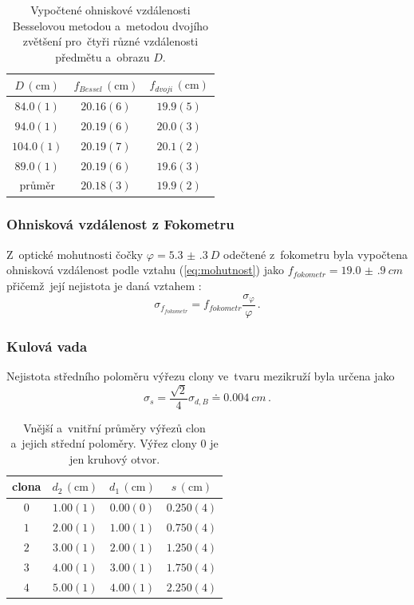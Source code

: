 \documentclass{../concepts/titul_zprava_p/prepareprotokolZprava} %
\newcommand{\relative}[1]{
\frac{\sigma_{#1}}{#1}
}
\begin{document}
\begin{table}[!htbp]
\centering
\caption{Vypočtené ohniskové vzdálenosti Besselovou metodou a~metodou dvojího zvětšení pro~čtyři různé vzdálenosti předmětu
a~obrazu $D$.}
\begin{tabular}{ccc}
 \toprule
 $D\, (\mathrm{cm})$ & $f_{Bessel}\, (\mathrm{cm})$ & $f_{dvoji}\, (\mathrm{cm})$ \\
 \midrule
 $84.0(1)$ & $20.16(6)$ & $19.9(5)$ \\
 $94.0(1)$ & $20.19(6)$ & $20.0(3)$ \\
 $104.0(1)$ & $20.19(7)$ & $20.1(2)$ \\
 $89.0(1)$ & $20.19(6)$ & $19.6(3)$ \\
 \midrule
 průměr & $20.18(3)$ & $19.9(2)$ \\
 \bottomrule
\end{tabular}
\label{tab:ohniskove_vzdalenosti}
\end{table}

\subsubsection{Ohnisková vzdálenost z Fokometru}
Z~optické mohutnosti čočky $\varphi = \qty{5.3(3)}{D}$ odečtené z~fokometru byla vypočtena ohnisková vzdálenost 
podle vztahu (\ref{eq:mohutnost}) jako $f_{fokometr} = \qty{19.0(9)}{cm}$
přičemž~její nejistota je daná vztahem \cite{englich}:
\begin{equation}
    \label{eq:sigma_f_mohutnost}
    \sigma_{f_{fokometr}} = f_{fokometr} \relative{\varphi} \,.
\end{equation}


\subsubsection{Kulová vada}

Nejistota středního poloměru výřezu clony ve~tvaru mezikruží byla určena jako
\begin{equation}
    \label{eq:sigma_s}
    \sigma_s = \frac{\sqrt{2}}{4} \sigma_{d,B} \doteq \qty{0.004}{cm} \,.
\end{equation}

\begin{table}[!htbp]
\centering
\caption{Vnější a~vnitřní průměry výřezů clon a~jejich střední poloměry. Výřez clony $0$ je jen kruhový otvor.}
\begin{tabular}{cccc}
 \toprule
 clona & $d_2\, (\mathrm{cm})$ & $d_1\, (\mathrm{cm})$ & $s\, (\mathrm{cm})$ \\
 \midrule
 $0$ & $1.00(1)$ & $0.00(0)$ & $0.250(4)$ \\
 $1$ & $2.00(1)$ & $1.00(1)$ & $0.750(4)$ \\
 $2$ & $3.00(1)$ & $2.00(1)$ & $1.250(4)$ \\
 $3$ & $4.00(1)$ & $3.00(1)$ & $1.750(4)$ \\
 $4$ & $5.00(1)$ & $4.00(1)$ & $2.250(4)$ \\
 \bottomrule
\end{tabular}
\label{tab:clony}
\end{table}
\end{document}
